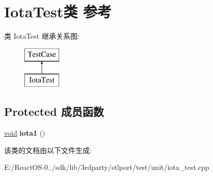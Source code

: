 \hypertarget{class_iota_test}{}\section{Iota\+Test类 参考}
\label{class_iota_test}
类 Iota\+Test 继承关系图\+:\begin{figure}[H]
\begin{center}
\leavevmode
\includegraphics[height=2.000000cm]{class_iota_test}
\end{center}
\end{figure}
\subsection*{Protected 成员函数}
\begin{DoxyCompactItemize}
\item 
\mbox{\label{class_iota_test_aa7fa3cbfa4a605e36f9fcd13e1ec3cee}} 
\hyperlink{interfacevoid}{void} {\bfseries iota1} ()
\end{DoxyCompactItemize}


该类的文档由以下文件生成\+:\begin{DoxyCompactItemize}
\item 
E\+:/\+React\+O\+S-\/0../sdk/lib/3rdparty/stlport/test/unit/iota\+\_\+test.\+cpp\end{DoxyCompactItemize}
